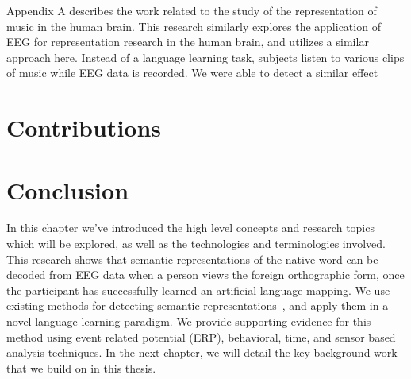 Appendix A describes the work related to the study of the representation of 
music in the human brain. This research similarly explores the application of 
EEG for representation research in the human brain, and utilizes a similar 
approach here. Instead of a language learning task, subjects listen to various 
clips of music while EEG data is recorded. We were able to detect a similar 
effect 

\section{Contributions}

\section{Conclusion}

In this chapter we've introduced the high level concepts and research topics 
which will be explored, as well as the technologies and terminologies involved.  
This research shows that semantic representations of the native word can be 
decoded from EEG data when a person views the foreign orthographic form, once 
the participant has successfully learned an artificial language mapping.  We 
use existing methods for detecting semantic representations~\cite{Sudre2012}, 
and apply them in a novel language learning paradigm. We provide supporting 
evidence for this method using event related potential (ERP), behavioral, time, 
and sensor based analysis techniques. In the next chapter, we will detail the 
key background work that we build on in this thesis. 
